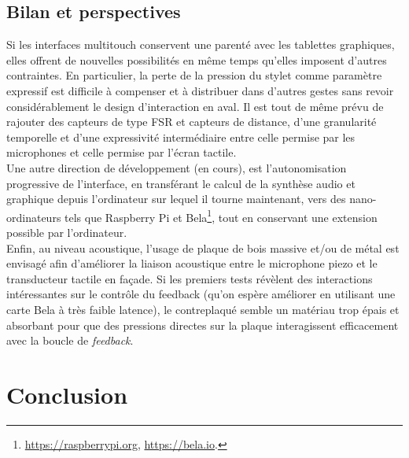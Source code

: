 \subsection{Bilan et perspectives}

\noindent Si les interfaces multitouch conservent une parenté avec les tablettes graphiques, elles offrent de nouvelles possibilités en même temps qu'elles imposent d'autres contraintes. En particulier, la perte de la pression du stylet comme paramètre expressif est difficile à compenser et à distribuer dans d'autres gestes sans revoir considérablement le design d'interaction en aval. Il est tout de même prévu de rajouter des capteurs de type \gls{FSR} et capteurs de distance, d'une granularité temporelle et d'une expressivité intermédiaire entre celle permise par les microphones et celle permise par l'écran tactile.\\
\indent Une autre direction de développement (en cours), est l'autonomisation progressive de l'interface, en transférant le calcul de la synthèse audio et graphique depuis l'ordinateur sur lequel il tourne maintenant, vers des nano-ordinateurs tels que Raspberry Pi et Bela\footnote{\url{https://raspberrypi.org}, \url{https://bela.io}.}, tout en conservant une extension possible par l'ordinateur.\\
\indent Enfin, au niveau acoustique, l'usage de plaque de bois massive et/ou de métal est envisagé afin d'améliorer la liaison acoustique entre le microphone piezo et le transducteur tactile en façade. Si les premiers tests révèlent des interactions intéressantes sur le contrôle du feedback (qu'on espère améliorer en utilisant une carte Bela à très faible latence), le contreplaqué semble un matériau trop épais et absorbant pour que des pressions directes sur la plaque interagissent efficacement avec la boucle de \textit{feedback}.


\section{Conclusion}
\label{sec:interfaces:conclusion}

